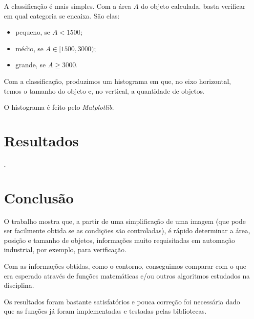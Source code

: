\documentclass[brazilian,a4paper,twocolumn]{article}
\begin{document}
        A classificação é mais simples. Com a área $A$ do objeto calculada, basta verificar em qual categoria se encaixa. São elas:
        \begin{itemize}
            \item pequeno, se $A < 1500$;
            \item médio, se $A \in [1500, 3000)$;
            \item grande, se $A \geq 3000$.
        \end{itemize}

        Com a classificação, produzimos um histograma em que, no eixo horizontal, temos o tamanho do objeto e, no vertical, a quantidade de objetos.

        O histograma é feito pelo \emph{Matplotlib}.

\section{Resultados}

    .


\section{Conclusão}

    O trabalho mostra que, a partir de uma simplificação de uma imagem (que pode ser facilmente obtida se as condições são controladas), é rápido determinar a área, posição e tamanho de objetos, informações muito requisitadas em automação industrial, por exemplo, para verificação.

    Com as informações obtidas, como o contorno, conseguimos comparar com o que era esperado através de funções matemáticas e/ou outros algoritmos estudados na disciplina.

    Os resultados foram bastante satisfatórios e pouca correção foi necessária dado que as funções já foram implementadas e testadas pelas bibliotecas.
\end{document}
